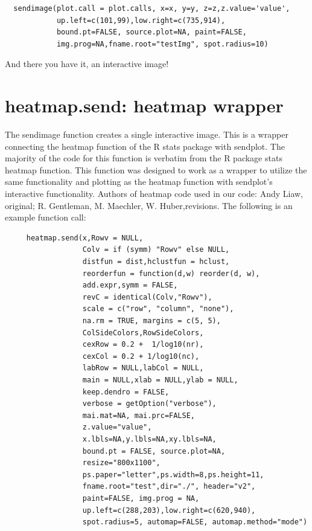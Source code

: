 \documentclass[]{article}
\begin{document}
\begin{verbatim}
  sendimage(plot.call = plot.calls, x=x, y=y, z=z,z.value='value',
            up.left=c(101,99),low.right=c(735,914),
            bound.pt=FALSE, source.plot=NA, paint=FALSE,
            img.prog=NA,fname.root="testImg", spot.radius=10)

\end{verbatim}

And there you have it, an interactive image! 

\newpage

\section{heatmap.send: heatmap wrapper}


The sendimage function creates a single interactive image. This is a wrapper connecting the heatmap function of the R stats package with sendplot. The majority of the code for this function is verbatim from the R package stats heatmap function. This function was designed to work as a wrapper to utilize the same functionality and plotting as the heatmap function with sendplot's interactive functionality. Authors of heatmap code used in our code: Andy Liaw, original; R. Gentleman, M. Maechler, W. Huber,revisions. The following is an example function call: 

\begin{verbatim}
     heatmap.send(x,Rowv = NULL,
                  Colv = if (symm) "Rowv" else NULL, 
                  distfun = dist,hclustfun = hclust,
                  reorderfun = function(d,w) reorder(d, w),
                  add.expr,symm = FALSE,
                  revC = identical(Colv,"Rowv"),
                  scale = c("row", "column", "none"),
                  na.rm = TRUE, margins = c(5, 5),
                  ColSideColors,RowSideColors,
                  cexRow = 0.2 +  1/log10(nr),
                  cexCol = 0.2 + 1/log10(nc),
                  labRow = NULL,labCol = NULL,
                  main = NULL,xlab = NULL,ylab = NULL,
                  keep.dendro = FALSE, 
                  verbose = getOption("verbose"),
                  mai.mat=NA, mai.prc=FALSE,
                  z.value="value",
                  x.lbls=NA,y.lbls=NA,xy.lbls=NA,
                  bound.pt = FALSE, source.plot=NA,
                  resize="800x1100",
                  ps.paper="letter",ps.width=8,ps.height=11,
                  fname.root="test",dir="./", header="v2",
                  paint=FALSE, img.prog = NA,
                  up.left=c(288,203),low.right=c(620,940),
                  spot.radius=5, automap=FALSE, automap.method="mode") 
\end{verbatim}
\end{document}
